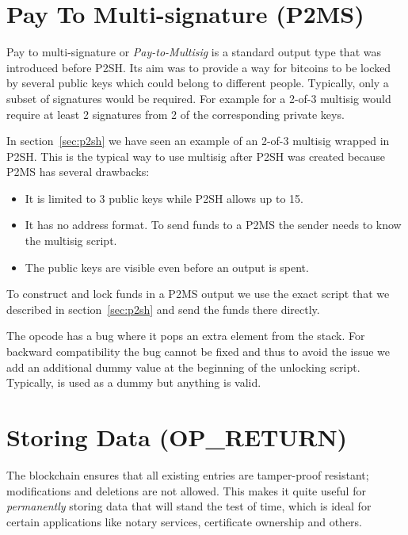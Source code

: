 \vspace{1em}


\section{Pay To Multi-signature (P2MS)}
Pay to multi-signature or \emph{Pay-to-Multisig} is a standard output type that was introduced before P2SH. Its aim was to provide a way for bitcoins to be locked by several public keys which could belong to different people. Typically, only a subset of signatures would be required. For example for a 2-of-3 multisig would require at least 2 signatures from 2 of the corresponding private keys.

In section~\ref{sec:p2sh} we have seen an example of an 2-of-3 multisig wrapped in P2SH. This is the typical way to use multisig after P2SH was created because P2MS has several drawbacks:
\begin{itemize}
\item It is limited to 3 public keys while P2SH allows up to 15.
\item It has no address format. To send funds to a P2MS the sender needs to know the multisig script.
\item The public keys are visible even before an output is spent.
\end{itemize}

To construct and lock funds in a P2MS output we use the exact script that we described in section~\ref{sec:p2sh} and send the funds there directly.

\begin{note}
The  opcode has a bug where it pops an extra element from the stack. For backward compatibility the bug cannot be fixed and thus to avoid the issue we add an additional dummy value at the beginning of the unlocking script. Typically,  is used as a dummy but anything is valid.
\end{note}


\section{Storing Data (OP\_RETURN)}
The blockchain ensures that all existing entries are tamper-proof resistant; modifications and deletions are not allowed. This makes it quite useful for \emph{permanently} storing data that will stand the test of time, which is ideal for certain applications like notary services, certificate ownership and others.

